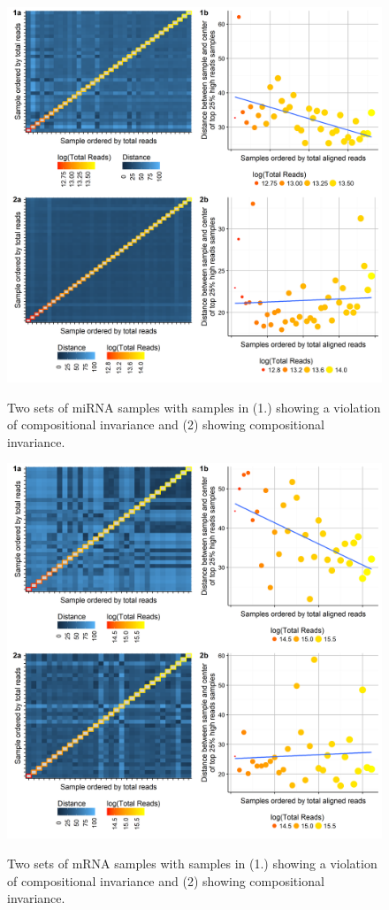 \begin{figure}
\centering
\includegraphics[scale=0.6]{./Figures/CompInvPlots_miRNA}
\label{miComp}
\caption{Two sets of miRNA samples with samples in (1.) showing a violation of compositional invariance and (2) showing compositional invariance.}
\end{figure}


\begin{figure}
\centering
\includegraphics[scale=0.6]{./Figures/CompInvPlots_Celgene}
\label{celComp}
\caption{Two sets of mRNA samples with samples in (1.) showing a violation of compositional invariance and (2) showing compositional invariance.}
\end{figure}

